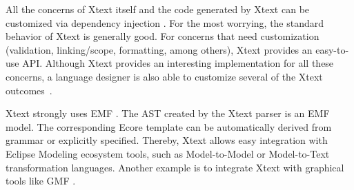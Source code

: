 \documentclass[twocolumn]{bmcart}%
\begin{document}

All the concerns of Xtext itself and the code generated by Xtext can be customized via dependency injection \cite{prasanna2009}. For the most worrying, the standard behavior of Xtext is generally good. For concerns that need customization (validation, linking/scope, formatting, among others), Xtext provides an easy-to-use API. Although Xtext provides an interesting implementation for all these concerns, a language designer is also able to customize several of the Xtext outcomes~\cite{bettini2016}.


Xtext strongly uses EMF \cite{blewitt2013}. The AST created by the Xtext parser is an EMF model. The corresponding Ecore template can be automatically derived from grammar or explicitly specified. Thereby, Xtext allows easy integration with Eclipse Modeling ecosystem tools, such as Model-to-Model or Model-to-Text transformation languages. Another example is to integrate Xtext with graphical tools like GMF \cite{eysholdt2010}.

\end{document}
